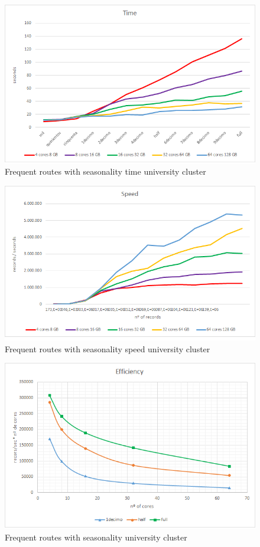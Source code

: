 \begin{figure}[htp!]
	\centering
	\caption{Frequent routes with seasonality time university cluster}
	\label{tfdu}
	\vspace{5pt}
	\includegraphics[scale=0.8]{geng/tfdu}
\end{figure}
\begin{figure}[htp!]
	\centering
	\caption{Frequent routes with seasonality speed university cluster}
	\label{sfdu}
	\vspace{5pt}
	\includegraphics[scale=0.85]{geng/sfdu}
\end{figure}
\begin{figure}[htp!]
	\centering
	\caption{Frequent routes with seasonality university cluster}
	\label{efdu}
	\vspace{5pt}
	\includegraphics[scale=0.85]{geng/efdu}
\end{figure}

